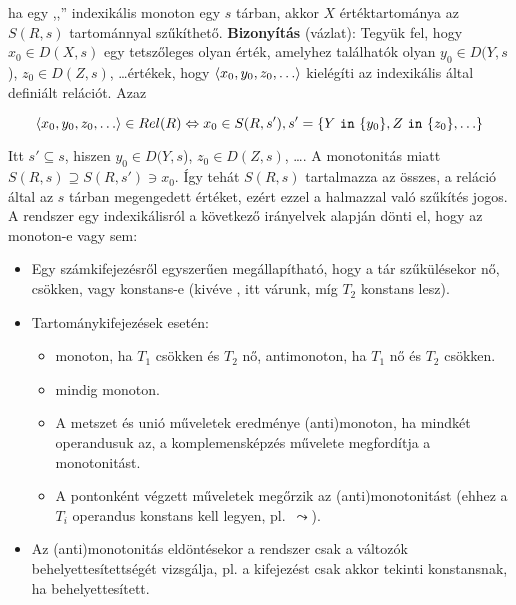 
\tetel ha egy ,,'' indexikális monoton egy $s$ tárban, akkor
$X$ értéktartománya az $S(R,s)$ tartománnyal szűkíthető.
\br
{\bf Bizonyítás} (vázlat): Tegyük fel, hogy $x_0 \in D(X,s)$ egy tetszőleges olyan
érték, amelyhez találhatók olyan $y_0 \in D(Y,s$), $z_0 \in D(Z,s)$, \ldots értékek, hogy
$\left\langle x_0,y_0,z_0,\ldots\right\rangle$ kielégíti az indexikális által definiált relációt. Azaz

\[ \left\langle x_0,y_0,z_0,\ldots\right\rangle \in Rel(R) \Leftrightarrow x_0 \in S(R, s'),
s'= \{Y~\texttt{in}~\{y_0\},Z~\texttt{in}~\{z_0\},\ldots\} \]

Itt $s' \subseteq s$, hiszen $y_0 \in D(Y,s$), $z_0 \in D(Z,s)$,
\ldots. A monotonitás miatt $S(R, s)
\supseteq S(R, s') \ni x_0$. Így tehát $S(R, s)$ tartalmazza az összes, a
reláció által az $s$ tárban megengedett értéket, ezért ezzel a halmazzal
való szűkítés jogos.
\br
A \clpfd rendszer egy indexikálisról a következő irányelvek alapján dönti el, hogy
az monoton-e vagy sem:

\begin{itemize}
\item Egy számkifejezésről egyszerűen megállapítható, hogy a tár
szűkülésekor nő, csökken, vagy konstans-e (kivéve , itt
várunk, míg $T_2$ konstans lesz).
\item Tartománykifejezések esetén:
\begin{itemize}
\item {} monoton, ha $T_1$ csökken és $T_2$ nő, antimonoton,
 ha $T_1$ nő és $T_2$ csökken.
\item {} mindig monoton.
\item A metszet és unió műveletek eredménye (anti)monoton, ha mindkét
operandusuk az, a komplemensképzés művelete megfordítja a monotonitást.
\item A pontonként végzett műveletek megőrzik az (anti)monotonitást (ehhez a
$T_i$ operandus konstans kell legyen, pl.\ $\leadsto$).
\end{itemize}
\item Az (anti)monotonitás eldöntésekor a rendszer csak a változók behelyettesítettségét
vizsgálja, pl. a  kifejezést csak akkor tekinti
konstansnak, ha  behelyettesített.
\end{itemize}

